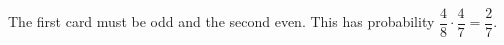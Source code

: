 The first card must be odd and the second even. This has probability $\dfrac{4}{8}\cdot\dfrac{4}{7}=\boxed{\dfrac{2}{7}}$.
